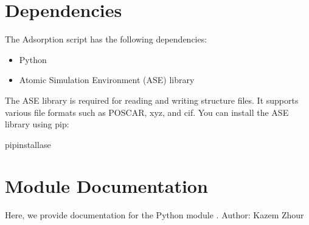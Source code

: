 \documentclass[letterpaper,10pt,english]{sphinxmanual}
\begin{document}
\sphinxstepscope


\section{Dependencies}
\label{\detokenize{dependencies:dependencies}}\label{\detokenize{dependencies::doc}}
\sphinxAtStartPar
The Adsorption script has the following dependencies:
\begin{itemize}
\item {} 
\sphinxAtStartPar
Python

\item {} 
\sphinxAtStartPar
Atomic Simulation Environment (ASE) library

\end{itemize}

\sphinxAtStartPar
The ASE library is required for reading and writing structure files. It supports various file formats such as POSCAR, xyz, and cif. You can install the ASE library using pip:

\begin{sphinxVerbatim}[commandchars=\\\{\}]
pipinstallase
\end{sphinxVerbatim}

\sphinxstepscope


\section{Module Documentation}
\label{\detokenize{module_documentation:module-documentation}}\label{\detokenize{module_documentation::doc}}
\sphinxAtStartPar
Here, we provide documentation for the Python module .
\label{\detokenize{module_documentation:module-Adsorption}}
\sphinxAtStartPar
Author: Kazem Zhour
\end{document}
